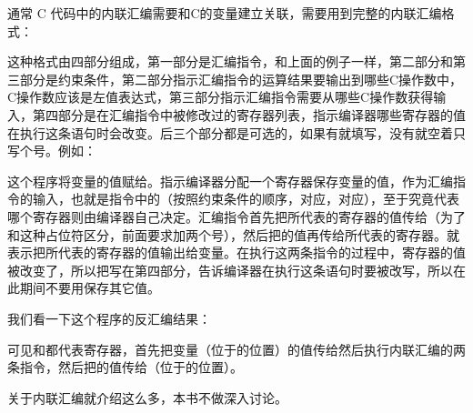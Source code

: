 

通常 C 代码中的内联汇编需要和C的变量建立关联，需要用到完整的内联汇编格式：




这种格式由四部分组成，第一部分是汇编指令，和上面的例子一样，第二部分和第三部分是约束条件，第二部分指示汇编指令的运算结果要输出到哪些C操作数中，C操作数应该是左值表达式，第三部分指示汇编指令需要从哪些C操作数获得输入，第四部分是在汇编指令中被修改过的寄存器列表，指示编译器哪些寄存器的值在执行这条语句时会改变。后三个部分都是可选的，如果有就填写，没有就空着只写个\BookCode{:\BookSplit{}}号。例如：





这个程序将变量的值赋给。指示编译器分配一个寄存器保存变量的值，作为汇编指令的输入，也就是指令中的（按照约束条件的顺序，对应，对应），至于究竟代表哪个寄存器则由编译器自己决定。汇编指令首先把所代表的寄存器的值传给（为了和这种占位符区分，前面要求加两个\BookCode{\%}号），然后把的值再传给所代表的寄存器。就表示把所代表的寄存器的值输出给变量。在执行这两条指令的过程中，寄存器的值被改变了，所以把写在第四部分，告诉编译器在执行这条语句时要被改写，所以在此期间不要用保存其它值。



我们看一下这个程序的反汇编结果：




可见和都代表寄存器，首先把变量（位于的位置）的值传给然后执行内联汇编的两条指令，然后把的值传给（位于的位置）。



关于内联汇编就介绍这么多，本书不做深入讨论。

